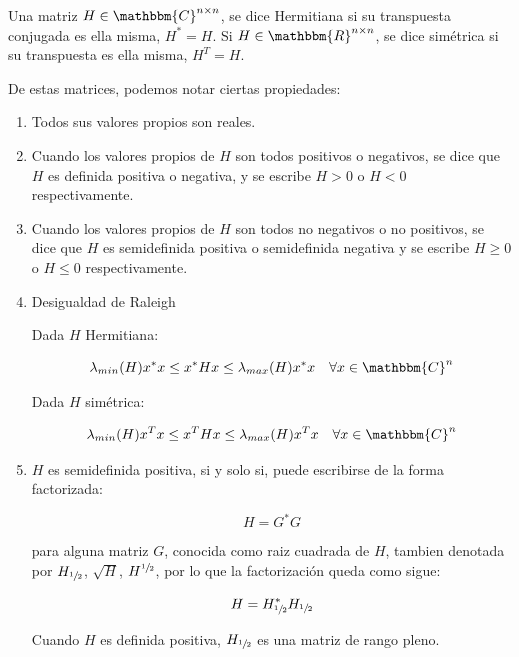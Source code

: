         \begin{nota}
            Una matriz $H \in \mathbbm{C}^{n\times n}$, se dice Hermitiana si su transpuesta conjugada es ella misma, $H^* = H$.
            Si $H \in \mathbbm{R}^{n \times n}$, se dice simétrica si su transpuesta es ella misma, $H^T = H$.

            De estas matrices, podemos notar ciertas propiedades:

            \begin{enumerate}
                \item Todos sus valores propios son reales.
                \item Cuando los valores propios de $H$ son todos positivos o negativos, se dice que $H$ es definida positiva o negativa, y se escribe $H > 0$ o $H < 0$ respectivamente.
                \item Cuando los valores propios de $H$ son todos no negativos o no positivos, se dice que $H$ es semidefinida positiva o semidefinida negativa y se escribe $H \ge 0$ o $H \le 0$ respectivamente.
                \item Desigualdad de Raleigh

                Dada $H$ Hermitiana:

                \begin{equation*}
                    \lambda_{min}(H) x^* x \le x^* H x \le \lambda_{max}(H) x^*x \quad \forall x \in \mathbbm{C}^n
                \end{equation*}

                Dada $H$ simétrica:

                \begin{equation*}
                    \lambda_{min}(H) x^T x \le x^T H x \le \lambda_{max}(H) x^T x \quad \forall x \in \mathbbm{C}^n
                \end{equation*}
                \item $H$ es semidefinida positiva, si y solo si, puede escribirse de la forma factorizada:

                \begin{equation*}
                    H = G^* G
                \end{equation*}

                para alguna matriz $G$, conocida como raiz cuadrada de $H$, tambien denotada por $H_{\sfrac{1}{2}}$, $\sqrt{H}$, $H^{\sfrac{1}{2}}$, por lo que la factorización queda como sigue:

                \begin{equation*}
                    H = H_{\sfrac{1}{2}}^* H_{\sfrac{1}{2}}
                \end{equation*}

                Cuando $H$ es definida positiva, $H_{\sfrac{1}{2}}$ es una matriz de rango pleno.
            \end{enumerate}
        \end{nota}


